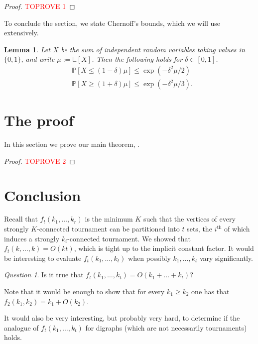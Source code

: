 \documentclass[english]{article}
\theoremstyle{plain}
\newtheorem{lemma}[theorem]{Lemma}
\theoremstyle{remark}
\newtheorem{question}[theorem]{Question}
\def\Ex{\mathbb{E}}
\renewcommand{\Pr}{\mathbb{P}}
\begin{document}
	\begin{proof}\textcolor{red}{TOPROVE 1}\end{proof}

	To conclude the section, we state Chernoff's bounds, which we will use extensively.

	\begin{lemma} \label{lem:chernoff}
		Let $X$ be the sum of independent random variables taking values in $\{0, 1\}$, and write $\mu := \Ex[X]$. Then the following holds for $\delta \in [0, 1]$.
		\begin{align*}
			& \Pr[X \le (1-\delta)\mu] \le \exp(-\delta^2 \mu / 2) \\
			& \Pr[X \ge (1+\delta)\mu] \le \exp(-\delta^2 \mu / 3).
		\end{align*}
	\end{lemma}

\section{The proof} \label{sec:proof}

	In this section we prove our main theorem, .


	\begin{proof}\textcolor{red}{TOPROVE 2}\end{proof}




\section{Conclusion} \label{sec:conclusion}

	Recall that $f_t(k_1, \ldots, k_r)$ is the minimum $K$ such that the vertices of every strongly $K$-connected tournament can be partitioned into $t$ sets, the $i^{\text{th}}$ of which induces a strongly $k_i$-connected tournament. We showed that $f_t(k, \ldots, k) = O(kt)$, which is tight up to the implicit constant factor. It would be interesting to evaluate $f_t(k_1, \ldots, k_t)$ when possibly $k_1, \ldots, k_t$ vary significantly. 

	\begin{question}
		Is it true that $f_t(k_1, \ldots, k_t) = O(k_1 + \ldots + k_t)$?
	\end{question}
    Note that it would be enough to show that for every  $k_1\geq k_2$ one has that $f_2(k_1,k_2)=k_1+O(k_2)$.
    
	It would also be very interesting, but probably very hard, to determine if the analogue of $f_t(k_1, \ldots, k_t)$ for digraphs (which are not necessarily tournaments) holds. 
\end{document}
